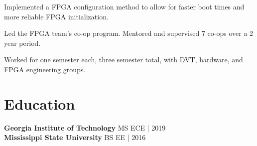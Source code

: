 \documentclass[10pt]{deedy-resume-reversed}
\begin{document}
\begin{minipage}[t]{1.0\textwidth}
\begin{tightemize}
\item Implemented a FPGA configuration method to allow for faster boot times and more reliable FPGA initialization.
\item Led the FPGA team's co-op program. Mentored and supervised 7 co-ops over a 2 year period.
\end{tightemize}
\sectionsep

\begin{tightemize}
\item Worked for one semester each, three semester total, with DVT, hardware, and FPGA engineering groups.
\end{tightemize}
\sectionsep



\section{Education}
\textbf{Georgia Institute of Technology} MS ECE | 2019  \\
\textbf{Mississippi State University} BS EE | 2016 \\
\sectionsep

\end{minipage}
\end{document}
